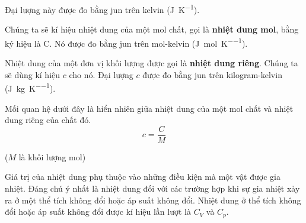 \noindent

Đại lượng này được đo bằng jun trên kelvin (\si{\joule\per\kelvin}).


Chúng ta sẽ kí hiệu nhiệt dung của một mol chất, gọi là \textbf{nhiệt dung mol}, bằng ký hiệu là C. Nó được đo bằng jun trên mol-kelvin (\si{\joule\per\mole\per\kelvin}).


Nhiệt dung của một đơn vị khối lượng được gọi là \textbf{nhiệt dung riêng}. Chúng ta sẽ dùng kí hiệu $c$ cho nó. Đại lượng $c$ được đo bằng jun trên kilogram-kelvin (\si{\joule\per\kilo\gram\per\kelvin}).


Mối quan hệ dưới đây là hiển nhiên giữa nhiệt dung của một mol chất và nhiệt dung riêng của chất đó. 
\begin{equation}\label{eq:10_25}
	c = \frac{C}{M}
\end{equation}

\noindent

($M$ là khối lượng mol)


Giá trị của nhiệt dung phụ thuộc vào những điều kiện mà một vật được gia nhiệt. Đáng chú ý nhất là nhiệt dung đối với các trường hợp khi sự gia nhiệt xảy ra ở một thể tích không đổi hoặc áp suất không đổi. Nhiệt dung ở thể tích không đổi hoặc áp suất không đổi được kí hiệu lần lượt là $C_V$ và $C_p$.


